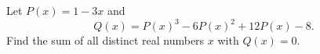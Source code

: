Let $P(x)=1-3x$ and
\[Q(x)=P(x)^3-6P(x)^2+12P(x)-8.\]
Find the sum of all distinct real numbers $x$ with $Q(x)=0$.
